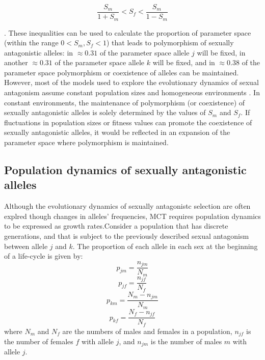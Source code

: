 \documentclass[]{article}
\begin{document}
 \begin{equation}
\frac{S_{m}}{1+S_{m}} < S_{f} < \frac{S_{m}}{1-S_{m}}
\label{selection}
 \end{equation}

\citep{kidwell1977regions,pamilo1979genic,connallon_evolutionary_2018}. These inequalities can be used to calculate the proportion of parameter space (within the range $ 0 < S_{m}, S_{f} < 1$) that leads to polymorphism of sexually antagonistic alleles: in $\approx 0.31$ of the parameter space allele $j$ will be fixed, in another $\approx 0.31$ of the parameter space allele $k$ will be fixed, and in $\approx 0.38$ of the parameter space polymorphism or coexistence of alleles can be maintained. However, most of the models used to explore the evolutionary dynamics of sexual antagonism assume constant population sizes and homogeneous environments \citep{kidwell1977regions,pamilo1979genic}. In constant environments, the maintenance of polymorphism (or coexistence) of sexually antagonistic alleles is solely determined by the values of $S_{m}$ and $S_{f}$. If fluctuations in population sizes or fitness values can promote the coexistence of sexually antagonistic alleles, it would be reflected in an expansion of the parameter space where polymorphism is maintained.


\subsection*{Population dynamics of sexually antagonistic alleles}

Although the evolutionary dynamics of sexually antagonistc selection are often explred though changes in alleles' frequencies, MCT requires population dynamics to be expressed as growth rates.Consider a population that has discrete generations, and that is subject to the previously described sexual antagonism between allele $j$ and $k$. The proportion of each allele in each sex at the beginning of a life-cycle is given by:
\begin{equation}
    p_{jm}= \frac{n_{jm}}{N_{m}}
    \label{first_pop}
\end{equation}
\begin{equation}
    p_{jf}= \frac{n_{jf}}{N_{f}}
\end{equation}
\begin{equation}
    p_{km}= \frac{N_{m}-n_{jm}}{N_{m}}
\end{equation}
\begin{equation}
    p_{kf}= \frac{N_{f}-n_{jf}}{N_{f}}
\end{equation}
where $N_m$ and $N_f$ are the numbers of males and females in a population, $n_{jf}$ is the number of females $f$ with allele $j$, and $n_{jm}$ is the number of males $m$ with allele $j$.
\end{document}
